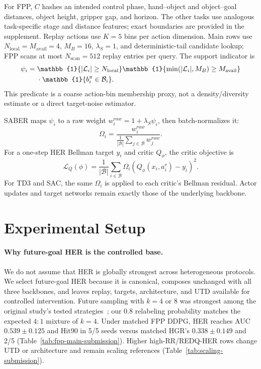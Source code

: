 \documentclass[letterpaper]{article}
\begin{document}
For FPP, \(C\) hashes an intended control phase, hand--object and object--goal distances, object height, gripper gap, and horizon. The other tasks use analogous task-specific stage and distance features; exact boundaries are provided in the supplement. Replay actions use \(K=5\) bins per action dimension. Main rows use \(N_{\mathrm{local}}=M_{\mathrm{avail}}=4\), \(M_B=16\), \(\lambda_S=1\), and deterministic-tail candidate lookup; FPP scans at most \(N_{\mathrm{scan}}=512\) replay entries per query. The support indicator is
\begin{align}
\psi_i={}&\mathbb{1}\{|\mathcal L_i|\ge N_{\mathrm{local}}\}
\mathbb{1}\{\min(|\mathcal L_i|,M_B)\ge M_{\mathrm{avail}}\}\notag\\
&\cdot \mathbb{1}\{b_i^\pi\in \mathcal B_i\}.
\end{align}
This predicate is a coarse action-bin membership proxy, not a density/diversity estimate or a direct target-noise estimator.

SABER maps \(\psi_i\) to a raw weight \(w_i^{raw}=1+\lambda_S\psi_i\), then batch-normalizes it:
\begin{equation}
\Omega_i=\frac{w_i^{raw}}{\frac{1}{|\mathcal B|}\sum_{j\in\mathcal B}w_j^{raw}}.
\end{equation}
For a one-step HER Bellman target \(y_i\) and critic \(Q_\phi\), the critic objective is
\begin{equation}
\mathcal L_Q(\phi)=\frac{1}{|\mathcal B|}\sum_{i\in\mathcal B}\Omega_i\left(Q_\phi(x_i,a_i^r)-y_i\right)^2.
\end{equation}
For TD3 and SAC, the same \(\Omega_i\) is applied to each critic's Bellman residual. Actor updates and target networks remain exactly those of the underlying backbone.

\section{Experimental Setup}

\paragraph{Why future-goal HER is the controlled base.}
We do not assume that HER is globally strongest across heterogeneous protocols. We select future-goal HER because it is canonical, composes unchanged with all three backbones, and leaves replay, targets, architecture, and UTD available for controlled intervention. Future sampling with \(k=4\) or 8 was strongest among the original study's tested strategies~\citep{andrychowicz2017her}; our 0.8 relabeling probability matches the expected \(4{:}1\) mixture of \(k=4\). Under matched FPP DDPG, HER reaches AUC \(0.539\pm0.125\) and Hit90 in 5/5 seeds versus matched HGR's \(0.338\pm0.149\) and 2/5 (Table~\ref{tab:fpp-main-submission}). Higher high-RR/REDQ-HER rows change UTD or architecture and remain scaling references (Table~\ref{tab:scaling-submission}).
\end{document}
